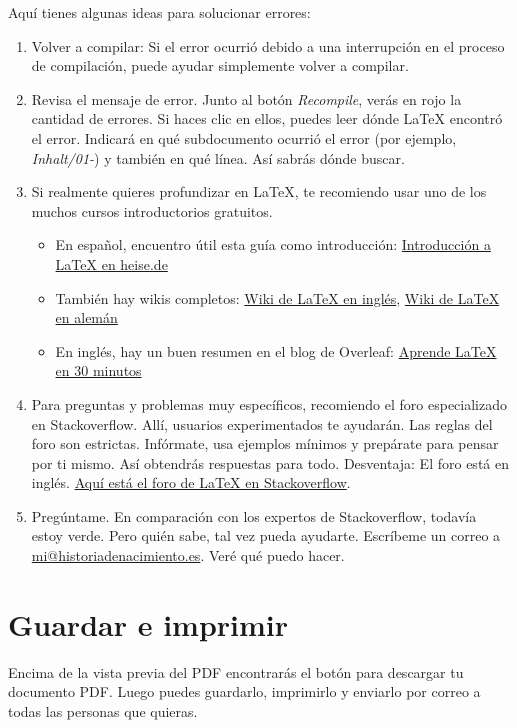 Aquí tienes algunas ideas para solucionar errores:
\begin{enumerate}
    \item Volver a compilar: Si el error ocurrió debido a una interrupción en el proceso de compilación, puede ayudar simplemente volver a compilar.
    \item Revisa el mensaje de error. Junto al botón \emph{Recompile}, verás en rojo la cantidad de errores. Si haces clic en ellos, puedes leer dónde \LaTeX{} encontró el error. Indicará en qué subdocumento ocurrió el error (por ejemplo, \textit{Inhalt/01-}) y también en qué línea. Así sabrás dónde buscar.
    \item Si realmente quieres profundizar en \LaTeX{}, te recomiendo usar uno de los muchos cursos introductorios gratuitos. \begin{itemize}
        \item En español, encuentro útil esta guía como introducción: \href{https://www.heise.de/download/blog/Einfuehrung-in-LaTeX-3599742}{Introducción a \LaTeX{} en heise.de}
        \item También hay wikis completos: \href{https://en.wikibooks.org/wiki/LaTeX}{Wiki de \LaTeX{} en inglés}, \href{https://de.wikibooks.org/wiki/LaTeX-Kompendium}{Wiki de \LaTeX{} en alemán}
        \item En inglés, hay un buen resumen en el blog de Overleaf: \href{https://www.overleaf.com/learn/latex/Learn_LaTeX_in_30_minutes}{Aprende \LaTeX{} en 30 minutos}
        \end{itemize}
        \item Para preguntas y problemas muy específicos, recomiendo el foro especializado en Stackoverflow. Allí, usuarios experimentados te ayudarán. Las reglas del foro son estrictas. Infórmate, usa ejemplos mínimos y prepárate para pensar por ti mismo. Así obtendrás respuestas para todo. Desventaja: El foro está en inglés. \href{https://tex.stackexchange.com/}{Aquí está el foro de \LaTeX{} en Stackoverflow}.
        \item Pregúntame. En comparación con los expertos de Stackoverflow, todavía estoy verde. Pero quién sabe, tal vez pueda ayudarte. Escríbeme un correo a \href{mailto:mi@historiadenacimiento.es}{mi@historiadenacimiento.es}. Veré qué puedo hacer.
\end{enumerate}

\section{Guardar e imprimir}
Encima de la vista previa del PDF encontrarás el botón para descargar tu documento PDF. Luego puedes guardarlo, imprimirlo y enviarlo por correo a todas las personas que quieras.


